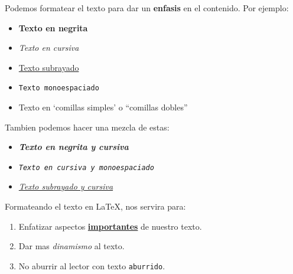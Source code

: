 \documentclass[12pt]{article}
\begin{document}
    \noindent Podemos formatear el texto para dar un \textbf{enfasis} en el
    contenido. Por ejemplo:

    \begin{itemize}
        \item \textbf{Texto en negrita}

        \item \textit{Texto en cursiva}

        \item \underline{Texto subrayado}

        \item \texttt{Texto monoespaciado}

        \item Texto en `comillas simples' o ``comillas dobles''
    \end{itemize}

    \noindent Tambien podemos hacer una mezcla de estas:
    \begin{itemize}
        \item \textbf{\textit{Texto en negrita y cursiva}}

        \item \textit{\texttt{Texto en cursiva y monoespaciado}}

        \item \underline{\textit{Texto subrayado y cursiva}}
    \end{itemize}

    \noindent Formateando el texto en \LaTeX, nos servira para:
    \begin{enumerate}
        \item Enfatizar aspectos \textbf{\underline{importantes}} de nuestro texto.

        \item Dar mas \textit{dinamismo} al texto.

        \item No aburrir al lector con texto \texttt{aburrido}.
    \end{enumerate}
\end{document}
